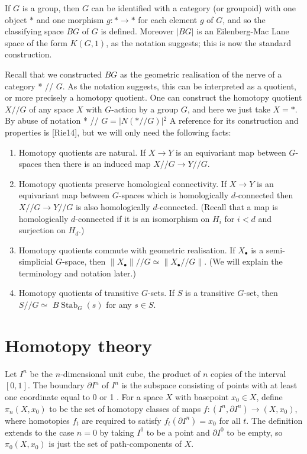 If $G$ is a group, then $G$ can be identified with a category (or groupoid) with one object $*$ and one morphism $g: * \rightarrow *$ for each element $g$ of $G$, and so the classifying space $B G$ of $G$ is defined. Moreover $|B G|$ is an Eilenberg-Mac Lane space of the form $K(G, 1)$, as the notation suggests; this is now the standard construction.


Recall that we constructed $B G$ as the geometric realisation of the nerve of a category * // $G$. As the notation suggests, this can be interpreted as a quotient, or more precisely a homotopy quotient. One can construct the homotopy quotient $X / / G$ of any space $X$ with $G$-action by a group $G$, and here we just take $X=*$. By abuse of notation * // $G=|N(* / / G)|{ }^2$ A reference for its construction and properties is [Rie14], but we will only need the following facts:

\begin{enumerate}
    \item Homotopy quotients are natural. If $X \rightarrow Y$ is an equivariant map between $G$-spaces then there is an induced map $X / / G \rightarrow Y / / G$.
    \item Homotopy quotients preserve homological connectivity. If $X \rightarrow Y$ is an equivariant map between $G$-spaces which is homologically $d$-connected then $X / / G \rightarrow Y / / G$ is also homologically $d$-connected. (Recall that a map is homologically $d$-connected if it is an isomorphism on $H_i$ for $i<d$ and surjection on $H_d$.)
    \item Homotopy quotients commute with geometric realisation. If $X_{\bullet}$ is a semi-simplicial $G$-space, then $\left\|X_{\bullet}\right\| / / G \simeq\left\|X_{\bullet} / / G\right\|$. (We will explain the terminology and notation later.)
    \item Homotopy quotients of transitive $G$-sets. If $S$ is a transitive $G$-set, then $S / / G \simeq$ $B \operatorname{Stab}_G(s)$ for any $s \in S$.
\end{enumerate}









\chapter{Homotopy theory}

Let $I^n$ be the $n$-dimensional unit cube, the product of $n$ copies of the interval $[0,1]$. The boundary $\partial I^n$ of $I^n$ is the subspace consisting of points with at least one coordinate equal to 0 or 1 . For a space $X$ with basepoint $x_0 \in X$, define $\pi_n\left(X, x_0\right)$ to be the set of homotopy classes of maps $f:\left(I^n, \partial I^n\right) \rightarrow\left(X, x_0\right)$, where homotopies $f_t$ are required to satisfy $f_t\left(\partial I^n\right)=x_0$ for all $t$. The definition extends to the case $n=0$ by taking $I^0$ to be a point and $\partial I^0$ to be empty, so $\pi_0\left(X, x_0\right)$ is just the set of path-components of $X$.

